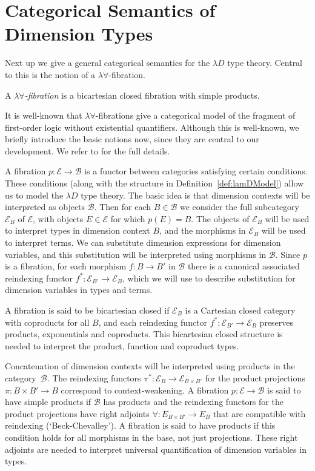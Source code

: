 \documentclass[a4paper,UKenglish]{lipics}
\newcommand{\B}{\mathcal{B}}
\newcommand{\E}{\mathcal{E}}
\begin{document}
\section{Categorical Semantics of Dimension Types} \label{sec:sem}
Next up we give a general categorical semantics for the $\lambda D$ type theory. Central to this is the notion of a $\lambda \forall$-fibration.

\begin{definition}
A \emph{$\lambda\forall$-fibration} is a bicartesian closed fibration with simple products.
\end{definition}

It is well-known that $\lambda \forall$-fibrations give a categorical model of the fragment of first-order logic without existential quantifiers. Although this is well-known, we briefly introduce the basic notions now, since they are central to our development. We refer to \cite{jacobs1999categorical} for the full details.

A fibration $p:\E\to\B$ is a functor between categories satisfying certain conditions. These conditions (along with the structure in Definition~\ref{def:lamDModel}) allow us to model the $\lambda D$ type theory. The basic idea is that dimension contexts will be interpreted as objects $\B$. Then for each $B\in\B$ we consider the full subcategory $\E_B$ of $\E$, with objects $E\in\E$ for which $p(E)=B$. The objects of $\E_B$ will be used to interpret types in dimension context $B$, and the morphisms in $\E_B$ will be used to interpret terms. We can substitute dimension expressions for dimension variables, and this substitution will be interpreted using morphisms in $\B$. Since $p$ is a fibration, for each morphism $f:B\to B'$ in $\B$ there is a canonical associated reindexing functor $f^\ast:\E_{B'}\to \E_B$, which we will use to describe substitution for dimension variables in types and terms.

A fibration is said to be bicartesian closed if $\E_B$ is a Cartesian closed category with coproducts for all $B$, and each reindexing functor $f^*:\E_{B'}\to\E_B$ preserves products, exponentials and coproducts. This bicartesian closed structure is needed to interpret the product, function and coproduct types.

Concatenation of dimension contexts will be interpreted using products in the category~$\B$. The reindexing functors  $\pi^\ast:\E_{B}\to \E_{B\times B'}$ for the product projections $\pi:B\times B'\to B$ correspond to context-weakening. A fibration $p:\E\to \B$ is said to have simple products if $\B$ has products and the reindexing functors for the product projections have right adjoints $\forall:E_{B\times B'}\to E_B$ that are compatible with reindexing (`Beck-Chevalley'). A fibration is said to have products if this condition holds for all morphisms in the base, not just projections. These right adjoints are needed to interpret universal quantification of dimension variables in types.
\end{document}
